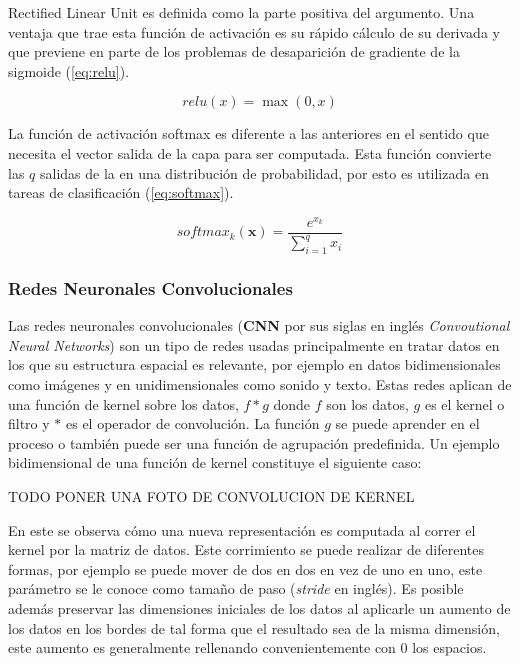 Rectified Linear Unit es definida como la parte positiva del argumento. Una ventaja que trae esta 
función de activación es su rápido cálculo de su derivada y que previene en parte de los problemas 
de desaparición de gradiente de la sigmoide (\ref{eq:relu}).

\begin{equation}
	relu(x) = \max(0, x)
\end{equation}\label{eq:relu}

La función de activación softmax es diferente a las anteriores en el sentido que necesita
el vector salida de la capa para ser computada. Esta función convierte las $q$ salidas
de la en una distribución de probabilidad, por esto es utilizada en tareas de clasificación (\ref{eq:softmax}).

\begin{equation}
	softmax_k(\textbf{x}) = \frac{e^{x_k}}{\sum_{i=1}^q x_i}
\end{equation}\label{eq:softmax}

\subsubsection{Redes Neuronales Convolucionales}

Las redes neuronales convolucionales (\textbf{CNN} por sus siglas en inglés \emph{Convoutional Neural Networks}) 
son un tipo de redes usadas
principalmente en tratar datos en los que su estructura espacial es relevante, por ejemplo
en datos bidimensionales como imágenes y en unidimensionales como sonido y texto.
Estas redes aplican de una función de kernel sobre los datos, $f * g$ donde $f$ son los
datos, $g$ es el kernel o filtro y $*$ es el operador de convolución. La función $g$ se puede 
aprender en el proceso o también puede ser una función de agrupación predefinida. 
Un ejemplo bidimensional de una función de kernel constituye el siguiente caso:

TODO PONER UNA FOTO DE CONVOLUCION DE KERNEL

En este se observa cómo una nueva representación es computada al correr el kernel por la matriz de datos. Este
corrimiento se puede realizar de diferentes formas, por ejemplo se puede mover de dos en dos en vez de uno en uno, este
parámetro se le conoce como tamaño de paso (\emph{stride} en inglés). Es posible además preservar las dimensiones
iniciales de los datos al aplicarle un aumento de los datos en los bordes de tal forma que el resultado sea de la misma
dimensión, este aumento es generalmente rellenando convenientemente con 0 los espacios.

